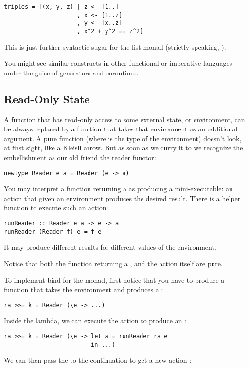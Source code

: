 \begin{Verbatim}
triples = [(x, y, z) | z <- [1..]
                     , x <- [1..z]
                     , y <- [x..z]
                     , x^2 + y^2 == z^2]
\end{Verbatim}
This is just further syntactic sugar for the list monad (strictly
speaking, ).

You might see similar constructs in other functional or imperative
languages under the guise of generators and coroutines.

\subsection{Read-Only State}

A function that has read-only access to some external state, or
environment, can be always replaced by a function that takes that
environment as an additional argument. A pure function
 (where  is the type of
the environment) doesn't look, at first sight, like a Kleisli arrow. But
as soon as we curry it to
 we recognize the
embellishment as our old friend the reader functor:

\begin{Verbatim}
newtype Reader e a = Reader (e -> a)
\end{Verbatim}
You may interpret a function returning a  as producing a
mini-executable: an action that given an environment produces the
desired result. There is a helper function  to execute
such an action:

\begin{Verbatim}
runReader :: Reader e a -> e -> a
runReader (Reader f) e = f e
\end{Verbatim}
It may produce different results for different values of the
environment.

Notice that both the function returning a , and the
 action itself are pure.

To implement bind for the  monad, first notice that you
have to produce a function that takes the environment  and
produces a :

\begin{Verbatim}
ra >>= k = Reader (\e -> ...)
\end{Verbatim}
Inside the lambda, we can execute the action  to produce an
:

\begin{Verbatim}
ra >>= k = Reader (\e -> let a = runReader ra e
                         in ...)
\end{Verbatim}
We can then pass the  to the continuation  to get a
new action :

